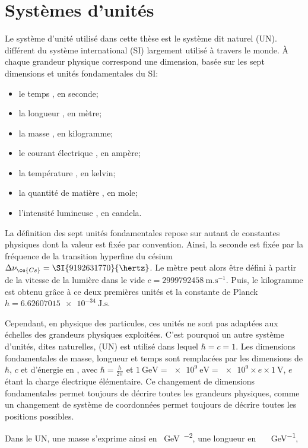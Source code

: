 \chapter*{Systèmes d'unités}\label{appendix-SI_UN}
Le système d'unité utilisé dans cette thèse
est le système dit \og naturel \fg{} (UN).
différent du système international (SI) \cite{BIPM_SI_9}
largement utilisé à travers le monde.
À chaque grandeur physique correspond une dimension,
basée sur les sept dimensions et unités fondamentales du SI:
\begin{itemize}
\item le temps \dimT, en seconde;
\item la longueur \dimL, en mètre;
\item la masse \dimM, en kilogramme;
\item le courant électrique \dimI, en ampère;
\item la température \dimtemp, en kelvin;
\item la quantité de matière \dimN, en mole;
\item l'intensité lumineuse \dimJ, en candela.
\end{itemize}
La définition des sept unités fondamentales repose sur autant de constantes physiques dont la valeur est fixée par convention.
Ainsi,
la seconde est fixée par la fréquence de la transition hyperfine du césium $\Delta \nu_{\ce{Cs}} = \SI{9192631770}{\hertz}$.
Le mètre peut alors être défini à partir de la vitesse de la lumière dans le vide $c=\SI{2999792458}{\meter.\second^{-1}}$.
Puis,
le kilogramme est obtenu grâce à ce deux premières unités et la constante de Planck $h = \SI{6.62607015e-34}{\joule.\second}$.
\par
Cependant, en physique des particules,
ces unités ne sont pas adaptées aux échelles des grandeurs physiques exploitées.
C'est pourquoi un autre système d'unités, dites naturelles, (UN) est utilisé dans lequel
$\hbar=c=1$.
Les dimensions fondamentales de masse, longueur et temps
sont remplacées par les dimensions de
$\hbar$, $c$ et d'énergie en \GeV,
avec $\hbar = \frac{h}{2\pi}$
et
$\SI{1}{\GeV} = \SI{e9}{\eV} = \num{e9} \times e \times \SI{1}{\volt}$,
$e$ étant la charge électrique élémentaire.
Ce changement de dimensions fondamentales permet toujours de décrire toutes les grandeurs physiques,
comme un changement de système de coordonnées permet toujours de décrire toutes les positions possibles.
\par
Dans le UN,
une masse s'exprime ainsi en \SI{}{\GeV.\clumunit^{-2}},
une longueur en \SI{}{\hbarunit.\clumunit.\GeV^{-1}},
